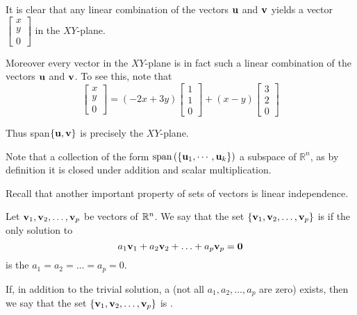 \documentclass{ximera}
\begin{document}
\begin{explanation}
It is clear that any linear combination of the vectors ${\bf u}$ and ${\bf v}$ yields a vector
$\begin{bmatrix}
x  \\ y \\ 0
\end{bmatrix}$ in the $XY$-plane.

Moreover every vector in the $XY$-plane is in fact such a linear
combination of the vectors ${\bf u}$ and ${\bf v}$. To see this, note that
$$\begin{bmatrix}
x  \\ y \\ 0
\end{bmatrix}
=
(-2x+3y) \begin{bmatrix}
1  \\ 1 \\ 0
\end{bmatrix}
+
(x-y)\begin{bmatrix}
3  \\ 2 \\ 0
\end{bmatrix}
$$

Thus  span$\{{\bf u},{\bf v}\}$ is precisely the $XY$-plane.
\end{explanation}

Note that a collection of the form $\mbox{span}\left( \{{\bf u}_1, \cdots , {\bf u}_k\}\right)$
a subspace of $\mathbb{R}^{n}$, as by definition it is closed under addition and scalar multiplication.

Recall that another important property of sets of vectors is linear independence.

\begin{definition}\label{def:linearindependenceReprise}
Let ${\bf v}_1, {\bf v}_2,\ldots ,{\bf v}_p$ be vectors of $\mathbb{R}^n$.  We say that the set $\{{\bf v}_1, {\bf v}_2,\ldots ,{\bf v}_p\}$ is  if the only solution to 
$$a_1{\bf v}_1+a_2{\bf v}_2+\ldots +a_p{\bf v}_p={\bf 0}$$
is the  $a_1=a_2=\ldots =a_p=0$.

If, in addition to the trivial solution, a  (not all $a_1, a_2,\ldots ,a_p$ are zero) exists, then we say that the set $\{{\bf v}_1, {\bf v}_2,\ldots ,{\bf v}_p\}$ is .
\end{definition}
\end{document}
